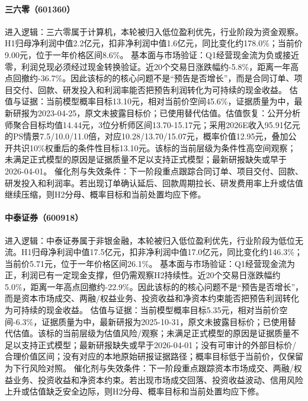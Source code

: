 \paragraph{三六零（601360）}
进入逻辑：三六零属于计算机，本轮被归入低位盈利优先，行业阶段为资金观察。H1归母净利润中值2.2亿元，扣非净利润中值1.6亿元，同比变化约178.0\%；当前价9.00元，位于一年价格区间8.6\%。
基本面与市场验证：Q1经营现金流为负或接近零，利润兑现必须经过现金转换验证。近20个交易日涨跌幅约-5.8\%，距离一年高点回撤约-36.7\%。因此该标的的核心问题不是“预告是否增长”，而是合同订单、项目交付、回款、研发投入和利润率能否把预告利润转化为可持续的现金收益。
估值与证据：当前模型概率目标13.10元，相对当前价空间45.6\%，证据质量为中，最新研报为2023-04-25，原文未披露目标价；已使用替代估值。估值恢复：公开分析师聚合目标均值14.44元，3位分析师区间13.70-15.17元；采用2026E收入95.91亿元的PS情景7.5/10.0/11.0倍，对应10.28/13.70/15.07元，概率价值12.95元，叠加公开共识10\%权重后的条件性目标13.10元。该标的当前层级为条件性高空间观察；未满足正式模型的原因是证据质量不足以支持正式模型；最新研报缺失或早于2026-04-01。
催化剂与失效条件：下一阶段重点跟踪合同订单、项目交付、回款、研发投入和利润率。若出现订单确认延后、回款周期拉长、研发费用率上升或估值继续压缩，则H2分母、概率目标和当前处置均应下修。

\paragraph{中泰证券（600918）}
进入逻辑：中泰证券属于非银金融，本轮被归入低位盈利优先，行业阶段为低位无流。H1归母净利润中值17.5亿元，扣非净利润中值17.0亿元，同比变化约146.3\%；当前价5.71元，位于一年价格区间26.1\%。
基本面与市场验证：Q1经营现金流为正，利润已有一定现金支撑，但仍需观察H2持续性。近20个交易日涨跌幅约5.0\%，距离一年高点回撤约-22.9\%。因此该标的的核心问题不是“预告是否增长”，而是资本市场成交、两融/权益业务、投资收益和净资本约束能否把预告利润转化为可持续的现金收益。
估值与证据：当前模型概率目标5.35元，相对当前价空间-6.3\%，证据质量为中，最新研报为2025-10-31，原文未披露目标价；已使用替代估值。该标的当前层级为估值风险/观察；未满足正式模型的原因是证据质量不足以支持正式模型；最新研报缺失或早于2026-04-01；没有可审计的外部目标价/合理价值区间；没有对应的本地原始研报证据路径；概率目标低于当前价，仅保留为下行风险对照。
催化剂与失效条件：下一阶段重点跟踪资本市场成交、两融/权益业务、投资收益和净资本约束。若出现市场成交回落、投资收益波动、信用风险上升或估值缺乏安全边际，则H2分母、概率目标和当前处置均应下修。

